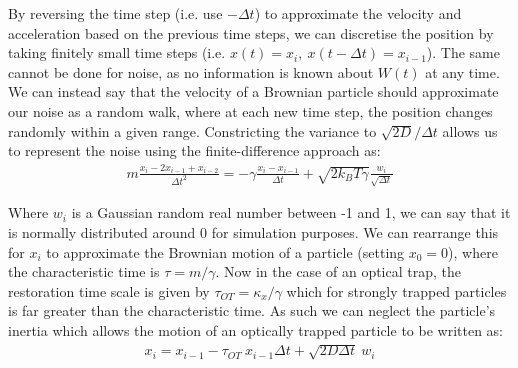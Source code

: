 By reversing the time step (i.e. use $-\Delta t$) to approximate 
the velocity and acceleration based on the previous time steps, 
we can discretise the position by taking finitely small  time 
steps (i.e. $x(t) = x_i,\ x(t-\Delta t) = x_{i-1}$). The same 
cannot be done for noise, as no information is known about $W(t)$ 
at any time. We can instead say that the velocity of a Brownian 
particle should approximate our noise as a random walk, where at 
each new time step, the position changes randomly within a given 
range. Constricting the variance to $\sqrt{2D}/\Delta t$ allows 
us to represent the noise using the finite-difference approach as:
\begin{align}
	m\frac{x_i-2x_{i-1}+x_{i-2}}{\Delta t^2} = -\gamma\frac{x_i-x_{i-1}}{\Delta t}+\sqrt{2k_BT\gamma}\frac{w_i}{\sqrt{\Delta t}}
\end{align}

Where $w_i$ is a Gaussian random real number between -1 and 1, we 
can say that it is normally distributed around 0 for simulation purposes. 
We can rearrange this for $x_i$ to approximate the Brownian motion 
of a particle (setting $x_0=0$), where the characteristic time is 
$\tau = m/\gamma$. Now in the case of an optical trap, the 
restoration time scale is given by $\tau_{OT}=\kappa_x/\gamma$ 
which for strongly trapped particles is far greater than the 
characteristic time. As such we can neglect the particle's inertia 
which allows the motion of an optically trapped particle to be written 
as:
\begin{align}
	\label{eq:sim_langevin}
	x_i = x_{i-1} - \tau_{OT}\ x_{i-1}\Delta t + \sqrt{2D\Delta t}\ w_i
\end{align} 

